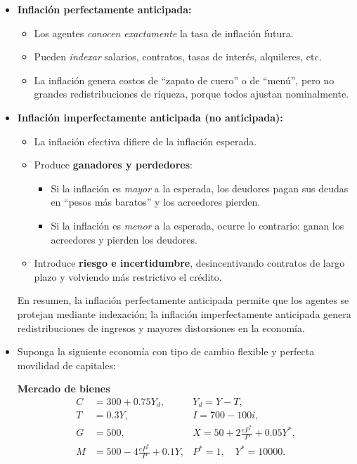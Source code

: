 \documentclass[11pt,addpoints]{article}
\begin{document}
\begin{enumerate}
\begin{itemize}
\item \textbf{Inflación perfectamente anticipada:}
  \begin{itemize}
    \item Los agentes \emph{conocen exactamente} la tasa de inflación futura.
    \item Pueden \emph{indexar} salarios, contratos, tasas de interés, alquileres, etc.
    \item La inflación genera costos de “zapato de cuero” o de “menú”, pero no grandes redistribuciones de riqueza, porque todos ajustan nominalmente.
  \end{itemize}

\item \textbf{Inflación imperfectamente anticipada (no anticipada):}
  \begin{itemize}
    \item La inflación efectiva difiere de la inflación esperada.
    \item Produce \textbf{ganadores y perdedores}:
      \begin{itemize}
        \item Si la inflación es \emph{mayor} a la esperada, los deudores pagan sus deudas en “pesos más baratos” y los acreedores pierden.
        \item Si la inflación es \emph{menor} a la esperada, ocurre lo contrario: ganan los acreedores y pierden los deudores.
      \end{itemize}
    \item Introduce \textbf{riesgo e incertidumbre}, desincentivando contratos de largo plazo y volviendo más restrictivo el crédito.
  \end{itemize}

En resumen, la inflación perfectamente anticipada permite que los agentes se protejan mediante indexación; la inflación imperfectamente anticipada genera redistribuciones de ingresos y mayores distorsiones en la economía.

\vspace{0.4cm}

\item Suponga la siguiente economía con tipo de cambio flexible y perfecta movilidad de capitales:

\textbf{Mercado de bienes}
\[
\begin{aligned}
C &= 300 + 0.75Y_d, &Y_d = Y - T, \\
T &= 0.3Y, &I = 700 - 100i, \\
G &= 500, &X = 50 + 2\frac{eP^*}{P} + 0.05Y^*, \\
M &= 500 - 4\frac{eP^*}{P} + 0.1Y, &P^* = 1, \quad Y^* = 10000.
\end{aligned}
\]


\end{itemize}
\end{enumerate}
\end{document}
